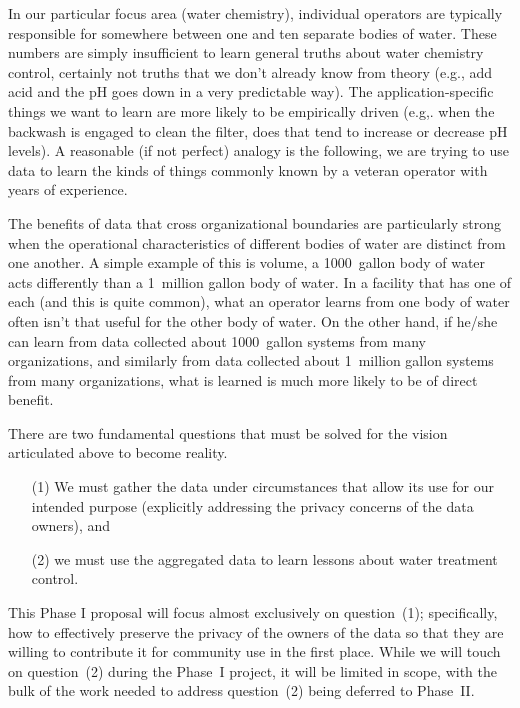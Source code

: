 In our particular focus area (water chemistry), individual operators are
typically responsible for somewhere between one and ten separate bodies
of water.  These numbers are simply insufficient to learn general truths
about water chemistry control, certainly not truths that we don't already
know from theory (e.g., add acid and the
pH goes down in a very predictable way).
The application-specific things we want to learn are more likely to
be empirically driven (e.g,. when the backwash is engaged to clean the
filter, does that tend to increase or decrease pH levels).  
A reasonable (if not perfect) analogy is the following, we are trying
to use data to learn the kinds of things commonly known by a 
veteran operator with years of experience.

The benefits of data that cross organizational boundaries are particularly
strong when the operational characteristics of different bodies of
water are distinct from one another.  A simple example of this is
volume, a 1000~gallon body of water acts differently than a 1~million
gallon body of water.  In a facility that has one of each (and this
is quite common), what an operator learns from one body of water often
isn't that useful for the other body of water.  On the other hand, if
he/she can learn from data collected about 1000~gallon systems from
many organizations, and similarly from data collected about 1~million
gallon systems from many organizations, what is learned is much more
likely to be of direct benefit.

There are two fundamental questions that must be solved for the
vision articulated above to become reality.
\begin{itemize}
\item[(1)] We must gather the
data under circumstances that allow its use for our intended purpose
(explicitly addressing the privacy concerns of the data owners), and
\item[(2)] we must use the aggregated data to learn lessons about water
treatment control.
\end{itemize}

This Phase I proposal will focus almost exclusively on question~(1);
specifically, how to effectively preserve the privacy of the owners
of the data so that they are willing to contribute it for community
use in the first place.
While we will touch on question~(2) during the Phase~I project, it will
be limited in scope, with the bulk of the work needed to address question~(2)
being deferred to Phase~II.


